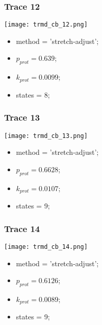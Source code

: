 \subsubsection{Trace 12}
\begin{minipage}[c]{0.7\textwidth}
	\texttt{[image: trmd\_cb\_12.png]}
\end{minipage}
\hfill
\begin{minipage}[c]{0.45\textwidth}
	\begin{itemize}
		\item method = 'stretch-adjust';
		\item $p_{prot}=0.639$;
		\item $k_{prot}=0.0099$;
		\item states = 8;
	\end{itemize}
\end{minipage}

\subsubsection{Trace 13}
\begin{minipage}[c]{0.7\textwidth}
	\texttt{[image: trmd\_cb\_13.png]}
\end{minipage}
\hfill
\begin{minipage}[c]{0.45\textwidth}
	\begin{itemize}
		\item method = 'stretch-adjust';
		\item $p_{prot}=0.6628$;
		\item $k_{prot}=0.0107$;
		\item states = 9;
	\end{itemize}
\end{minipage}

\subsubsection{Trace 14}
\begin{minipage}[c]{0.7\textwidth}
	\texttt{[image: trmd\_cb\_14.png]}
\end{minipage}
\hfill
\begin{minipage}[c]{0.45\textwidth}
	\begin{itemize}
		\item method = 'stretch-adjust';
		\item $p_{prot}=0.6126$;
		\item $k_{prot}=0.0089$;
		\item states = 9;
	\end{itemize}
\end{minipage}

